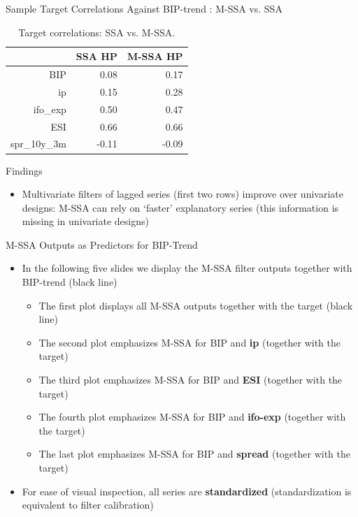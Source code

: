 \documentclass{beamer}
\begin{document}
\begin{frame} {Sample Target Correlations Against BIP-trend : M-SSA vs. SSA}\label{sample_target_cor2}
\begin{table}[ht]
\centering
\begin{tabular}{rrr}
  \hline
 & SSA HP & M-SSA HP \\ 
  \hline
BIP & 0.08 & 0.17 \\ 
  ip & 0.15 & 0.28 \\ 
  ifo\_exp & 0.50 & 0.47 \\ 
  ESI & 0.66 & 0.66 \\ 
  spr\_10y\_3m & -0.11 & -0.09 \\ 
   \hline
\end{tabular}
\caption{Target correlations: SSA vs. M-SSA.} 
\label{perf_var1}
\end{table}\end{frame}



\begin{frame} {Findings}
\begin{itemize}
\item Multivariate filters of lagged series (first two rows) improve over univariate designs: M-SSA can rely on `faster' explanatory series (this information is missing in univariate designs)
\end{itemize}
\end{frame}






\begin{frame} {M-SSA Outputs as Predictors for BIP-Trend}
\begin{itemize}
\item In the following five slides we display the M-SSA filter outputs together with BIP-trend (black line)
\begin{itemize}
\item The first plot displays all M-SSA outputs together with the target (black line)
\item The second plot emphasizes M-SSA for BIP and \textbf{ip} (together with the target)
\item The third plot emphasizes M-SSA for BIP and \textbf{ESI} (together with the target)
\item The fourth plot emphasizes M-SSA for BIP and \textbf{ifo-exp} (together with the target)
\item The last plot emphasizes M-SSA for BIP and \textbf{spread} (together with the target)
\end{itemize}
\item For ease of visual inspection, all series are \textbf{standardized} (standardization is equivalent to filter calibration)

\end{itemize}
\end{frame}
\end{document}
